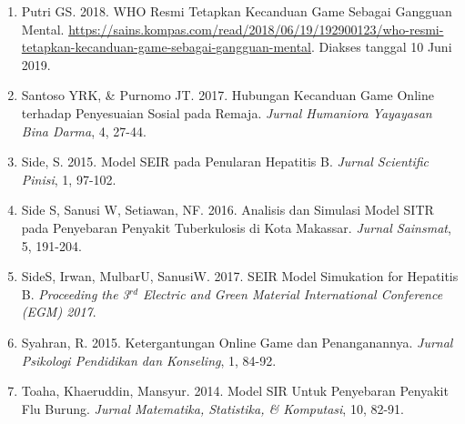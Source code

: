 \documentclass[a4paper, 12pt]{article}
\begin{document}
\begin{enumerate}[label={}, itemsep=0.5em, leftmargin=0pt, itemindent=1.5em, labelwidth=*, align=left, resume]
    \item Putri GS. 2018. WHO Resmi Tetapkan Kecanduan Game Sebagai Gangguan Mental. \url{https://sains.kompas.com/read/2018/06/19/192900123/who-resmi-tetapkan-kecanduan-game-sebagai-gangguan-mental}. Diakses tanggal 10 Juni 2019.
    \item Santoso YRK, \& Purnomo JT. 2017. Hubungan Kecanduan Game Online terhadap Penyesuaian Sosial pada Remaja. \textit{Jurnal Humaniora Yayayasan Bina Darma}, 4, 27-44.
    \item Side, S. 2015. Model SEIR pada Penularan Hepatitis B. \textit{Jurnal Scientific Pinisi}, 1, 97-102.
    \item Side S, Sanusi W, Setiawan, NF. 2016. Analisis dan Simulasi Model SITR pada Penyebaran Penyakit Tuberkulosis di Kota Makassar. \textit{Jurnal Sainsmat}, 5, 191-204.
    \item SideS, Irwan, MulbarU, SanusiW. 2017. SEIR Model Simukation for Hepatitis B. \textit{Proceeding the 3$^{rd}$ Electric and Green Material International Conference (EGM) 2017}.
    \item Syahran, R. 2015. Ketergantungan Online Game dan Penanganannya. \textit{Jurnal Psikologi Pendidikan dan Konseling}, 1, 84-92.
    \item Toaha, Khaeruddin, Mansyur. 2014. Model SIR Untuk Penyebaran Penyakit Flu Burung. \textit{Jurnal Matematika, Statistika, \& Komputasi}, 10, 82-91.
\end{enumerate}
\end{document}

